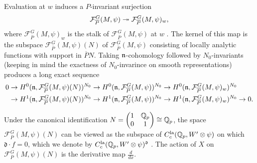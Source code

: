 \documentclass[10pt]{amsart}
\begin{document}
Evaluation at $w$ induces a $P$-invariant surjection \[ \mathcal{F}_{\overline{P}}^{G}(M,\psi) \twoheadrightarrow \mathcal{F}_{\overline{P}}^{G}(M,\psi)_{w}, \] where $\mathcal{F}_{\overline{P}}^{G}(M,\psi)_{w}$ is the stalk of $\mathcal{F}_{\overline{P}}^{G}(M,\psi)$ at $w$ \cite[Def. 2.4.2]{Jacquet2}. The kernel of this map is the subspace $\mathcal{F}_{\overline{P}}^{G}(M,\psi)(N)$ of $\mathcal{F}_{\overline{P}}^{G}(M,\psi)$ consisting of locally analytic functions with support in $\overline{P}N$. Taking $\mathfrak{n}$-cohomology followed by $N_{0}$-invariants (keeping in mind the exactness of $N_{0}$-invarince on smooth representations) produces a long exact sequence \begin{align}\begin{split}\label{eq:n_cohom1}
    0 & \rightarrow H^{0}(\mathfrak{n},\mathcal{F}_{\overline{P}}^{G}(M,\psi)(N))^{N_{0}} \rightarrow H^{0}(\mathfrak{n},\mathcal{F}_{\overline{P}}^{G}(M,\psi))^{N_{0}} \rightarrow H^{0}(\mathfrak{n},\mathcal{F}_{\overline{P}}^{G}(M,\psi)_{w})^{N_{0}} \\ 
    & \rightarrow H^{1}(\mathfrak{n},\mathcal{F}_{\overline{P}}^{G}(M,\psi)(N))^{N_{0}} \rightarrow H^{1}(\mathfrak{n},\mathcal{F}_{\overline{P}}^{G}(M,\psi))^{N_{0}} \rightarrow H^{1}(\mathfrak{n},\mathcal{F}_{\overline{P}}^{G}(M,\psi)_{w})^{N_{0}} \rightarrow 0.
\end{split}\end{align} 

Under the canonical identification $N= \begin{pmatrix} 1 & \mathbb{Q}_{p} \\ 0 & 1 \end{pmatrix}\cong \mathbb{Q}_{p}$, the space $\mathcal{F}_{\overline{P}}^{G}(M,\psi)(N)$ can be viewed as the subspace of $C^{\textnormal{la}}_{c}(\mathbb{Q}_{p},W^{\prime}\otimes\psi)$ on which $\mathfrak{d}\cdot f=0$, which we denote by $C^{\textnormal{la}}_{c}(\mathbb{Q}_{p},W^{\prime}\otimes\psi)^{\mathfrak{d}}$ \cite[Lem. 2.3.3]{Jacquet2}. The action of $X$ on $\mathcal{F}_{\overline{P}}^{G}(M,\psi)(N)$ is the derivative map $\frac{d}{dx}$. 
\end{document}
